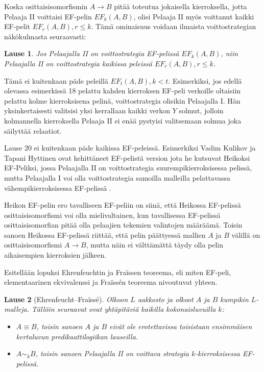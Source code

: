 \documentclass[finnish]{tktltiki2}
\newtheorem{lau}{Lause}
\theoremstyle{definition}
\theoremstyle{remark}
\begin{document}
Koska osittaisisomorfismin $A \rightarrow B$ pitää toteutua jokaisella kierroksella, jotta Pelaaja II voittaisi EF-pelin $EF_k(A, B)$, olisi Pelaaja II myös voittanut kaikki EF-pelit $EF_r(A, B), r \leq k$. Tämä ominaisuus voidaan ilmaista voittostrategian näkökulmasta seuraavasti:
\begin{lau}
Jos Pelaajalla II on voittostrategia EF-pelissä $EF_k(A, B)$, niin Pelaajalla II on voittostrategia kaikissa peleissä $EF_r(A, B), r \leq k$.
\end{lau}

Tämä ei kuitenkaan päde peleillä $EF_t(A, B), k < t$. Esimerkiksi, jos edellä olevassa esimerkissä 18 pelattu kahden kierroksen EF-peli verkoille oltaisiin pelattu kolme kierroksisena pelinä, voittostrategia olisikin Pelaajalla I. Hän yksinkertaisesti valitsisi yksi kerrallaan kaikki verkon $Y$ solmut, jolloin kolmannella kierroksella Pelaaja II ei enää pystyisi valitsemaan solmua joka säilyttää relaatiot.

Lause 20 ei kuitenkaan päde kaikissa EF-peleissä. Esimerkiksi Vadim Kulikov ja Tapani Hyttinen ovat kehittäneet EF-pelistä version jota he kutsuvat Heikoksi EF-Peliksi, jossa Pelaajalla II on voittostrategia suurempikierroksisessa pelissä, mutta Pelaajalla I voi olla voittostrategia samoilla malleilla pelattavassa vähempikierroksisessa EF-pelissä \cite{Hyt11}.

Heikon EF-pelin ero tavalliseen EF-peliin on siinä, että Heikossa EF-pelissä osittaisisomorfismi voi olla mielivaltainen, kun tavallisessa EF-pelissä osittaisisomorfian pitää olla pelaajien tekemien valintojen määräämä. Toisin sanoen Heikossa EF-pelissä riittää, että pelin päättyessä mallien $A$ ja $B$ välillä on osittaisisomorfismi $A \rightarrow B$, mutta näin ei välttämättä täydy olla pelin aikaisempien kierroksien jälkeen.

Esitellään lopuksi Ehrenfeuchtin ja Fraïssen teoreema, eli miten EF-peli, elementaarinen ekvivalenssi ja Fraïssén teoreema nivoutuvat yhteen.
\begin{lau}[Ehrenfeucht--Fraïssé]
Olkoon $L$ aakkosto ja olkoot $A$ ja $B$ kumpikin $L$-malleja. Tällöin seuraavat ovat yhtäpitäviä kaikilla kokonaisluvuilla $k$:
\begin{itemize}
\item $A \equiv B$, toisin sanoen $A$ ja $B$ eivät ole erotettavissa toisistaan ensimmäisen kertaluvun predikaattilogiikan lauseilla.
\item $A \sim_k B$, toisin sanoen Pelaajalla II on voittava strategia $k$-kierroksisessa EF-pelissä.
\end{itemize}
\end{lau}
\end{document}
